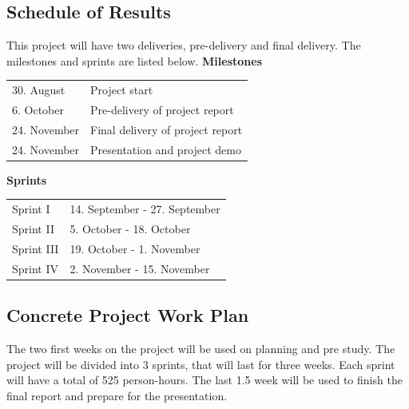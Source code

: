 \subsection{Schedule of Results}
This project will have two deliveries, pre-delivery and final delivery.  The milestones and sprints are listed below. \newline
\textbf{Milestones} \newline
\begin{tabular}{l  l}
	30. August & Project start \\
	6. October & Pre-delivery of project report \\
	24. November & Final delivery of project report \\
	24. November & Presentation and project demo \\
\end{tabular}
\newline
\textbf{Sprints} \newline
\begin{tabular}{l  l}
	Sprint I & 14. September - 27. September \\
	Sprint II & 5. October - 18. October \\
	Sprint III & 19. October - 1. November  \\
	Sprint IV & 2. November - 15. November \\
\end{tabular}

\subsection{Concrete Project Work Plan}
The two first weeks on the project will be used on planning and pre study.
The project will be divided into 3 sprints, that will last for three weeks. Each sprint will have a total of 525 person-hours.
The last 1.5 week will be used to finish the final report and prepare for the presentation. 


